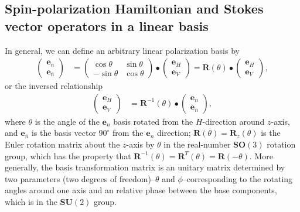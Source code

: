 \documentclass[preprint,aps,pra,onecolumn,superscriptaddress]{revtex4-1} %
\begin{document}
\begin{appendix}
\subsection{Spin-polarization Hamiltonian and Stokes vector operators in a linear basis}
In general, we can define an arbitrary linear polarization basis by
\begin{align}
\left(\!\begin{array}{c}
\mathbf{e}_n \\ \mathbf{e}_{\bar{n}}
\end{array}\!\right) &= 
\left(\!\!\begin{array}{cc}
\cos\theta & \sin\theta \\
- \sin\theta & \cos\theta
\end{array}\!\!\right)\bullet
\left(\!\begin{array}{c}
\mathbf{e}_H \\ \mathbf{e}_V
\end{array}\!\right)
=\mathbf{R}(\theta)\bullet \left(\!\begin{array}{c}
\mathbf{e}_H \\ \mathbf{e}_V
\end{array}\!\right),
\end{align}
or the inversed relationship
\begin{align}
\left(\!\begin{array}{c}\mathbf{e}_H \\ \mathbf{e}_V\end{array}\!\right)&= \mathbf{R}^{-1}(\theta)\bullet\left(\!\begin{array}{c}\mathbf{e}_n \\ \mathbf{e}_{\bar{n}}\end{array}\!\right),
\end{align}
where $ \theta $ is the angle of the $ \mathbf{e}_n $ basis rotated from the $ H $-direction around $ z $-axis, and $ \mathbf{e}_{\bar{n}} $ is the basis vector $ 90^\circ $ from the $ \mathbf{e}_n $ direction; $ \mathbf{R}(\theta)=\mathbf{R}_z(\theta) $ is the Euler rotation matrix about the $ z $-axis by $ \theta $ in the real-number $ \mathbf{SO}(3) $ rotation group, which has the property that $ \mathbf{R}^{-1}(\theta)=\mathbf{R}^T(\theta)=\mathbf{R}(-\theta) $. 
More generally, the basis transformation matrix is an unitary matrix determined by two parameters (two degrees of freedom)--$ \theta $ and $ \phi $--corresponding to the rotating angles around one axis and an relative phase between the base components, which is in the $ \mathbf{SU}(2) $ group.


\end{appendix}
\end{document}
